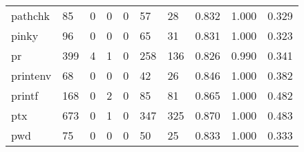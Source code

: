 \begin{longtable}{lp{1.3cm}p{1.3cm}p{1.3cm}p{1.3cm}p{1.3cm}p{1.3cm}p{1.3cm}p{1.3cm}p{1.3cm}}
pathchk   &                     85 &                                             0 &                                            0 &                                           0 &                                           57 &                                         28 &                                0.832 &                                  1.000 &                                0.329 \\
pinky     &                     96 &                                             0 &                                            0 &                                           0 &                                           65 &                                         31 &                                0.831 &                                  1.000 &                                0.323 \\
pr        &                    399 &                                             4 &                                            1 &                                           0 &                                          258 &                                        136 &                                0.826 &                                  0.990 &                                0.341 \\
printenv  &                     68 &                                             0 &                                            0 &                                           0 &                                           42 &                                         26 &                                0.846 &                                  1.000 &                                0.382 \\
printf    &                    168 &                                             0 &                                            2 &                                           0 &                                           85 &                                         81 &                                0.865 &                                  1.000 &                                0.482 \\
ptx       &                    673 &                                             0 &                                            1 &                                           0 &                                          347 &                                        325 &                                0.870 &                                  1.000 &                                0.483 \\
pwd       &                     75 &                                             0 &                                            0 &                                           0 &                                           50 &                                         25 &                                0.833 &                                  1.000 &                                0.333 \\

\end{longtable}
